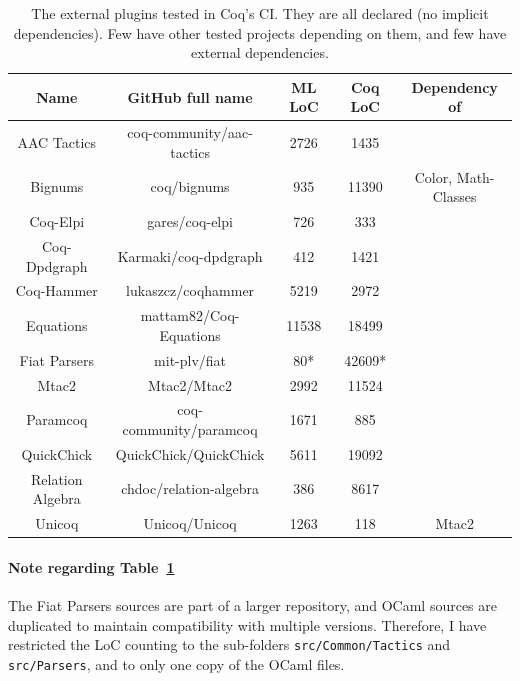 \begin{table}
	\begin{center}
		\begin{tabular}{|c|c|c|c|c|}
			\hline
			\textbf{Name} & \textbf{GitHub full name} & \textbf{ML LoC} & \textbf{Coq LoC} & \textbf{Dependency of} \\
			\hline
			AAC Tactics & coq-community/aac-tactics & 2726 & 1435 & \\
			\hline
			Bignums & coq/bignums & 935 & 11390 & Color, Math-Classes \\
			\hline
			Coq-Elpi & gares/coq-elpi & 726 & 333 & \\
			\hline
			Coq-Dpdgraph & Karmaki/coq-dpdgraph & 412 & 1421 & \\
			\hline
			Coq-Hammer & lukaszcz/coqhammer & 5219 & 2972 & \\
			\hline
			Equations & mattam82/Coq-Equations & 11538 & 18499 & \\
			\hline
			Fiat Parsers & mit-plv/fiat & 80* & 42609* & \\
			\hline
			Mtac2 & Mtac2/Mtac2 & 2992 & 11524 & \\
			\hline
			Paramcoq & coq-community/paramcoq & 1671 & 885 & \\
			\hline
			QuickChick & QuickChick/QuickChick & 5611 & 19092 & \\
			\hline
			Relation Algebra & chdoc/relation-algebra & 386 & 8617 & \\
			\hline
			Unicoq & Unicoq/Unicoq & 1263 & 118 & Mtac2 \\
			\hline
		\end{tabular}
	\end{center}
	\caption{
		The external plugins tested in Coq's CI. They are all declared (no implicit dependencies). Few have other tested projects depending on them, and few have external dependencies.
	}
	\label{tab:plugins}
\end{table}

\paragraph{Note regarding Table~\ref{tab:plugins}}

The Fiat Parsers sources are part of a larger repository, and OCaml sources are duplicated to maintain compatibility with multiple versions.
Therefore, I have restricted the LoC counting to the sub-folders \verb|src/Common/Tactics| and \verb|src/Parsers|, and to only one copy of the OCaml files.

